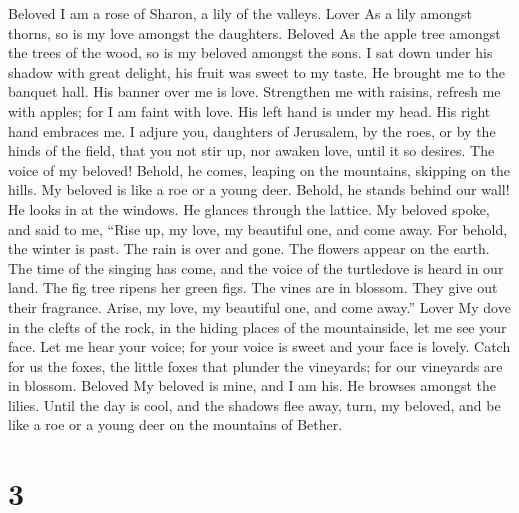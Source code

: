 Beloved  I am a rose of Sharon, a lily of the valleys.
Lover  As a lily amongst thorns, so is my love amongst the
daughters. Beloved  As the apple tree amongst the trees of
the wood, so is my beloved amongst the sons. I sat down under his shadow
with great delight, his fruit was sweet to my taste.  He
brought me to the banquet hall. His banner over me is love.
 Strengthen me with raisins, refresh me with apples; for I
am faint with love.  His left hand is under my head. His
right hand embraces me.  I adjure you, daughters of
Jerusalem, by the roes, or by the hinds of the field, that you not stir
up, nor awaken love, until it so desires.  The voice of my
beloved! Behold, he comes, leaping on the mountains, skipping on the
hills.  My beloved is like a roe or a young deer. Behold,
he stands behind our wall! He looks in at the windows. He glances
through the lattice.  My beloved spoke, and said to me,
``Rise up, my love, my beautiful one, and come away.  For
behold, the winter is past. The rain is over and gone. 
The flowers appear on the earth. The time of the singing has come, and
the voice of the turtledove is heard in our land.  The
fig tree ripens her green figs. The vines are in blossom. They give out
their fragrance. Arise, my love, my beautiful one, and come away.''
Lover  My dove in the clefts of the rock, in the hiding
places of the mountainside, let me see your face. Let me hear your
voice; for your voice is sweet and your face is lovely. 
Catch for us the foxes, the little foxes that plunder the vineyards; for
our vineyards are in blossom. Beloved  My beloved is
mine, and I am his. He browses amongst the lilies.  Until
the day is cool, and the shadows flee away, turn, my beloved, and be
like a roe or a young deer on the mountains of Bether.

\hypertarget{section-2}{%
\section{3}\label{section-2}}

